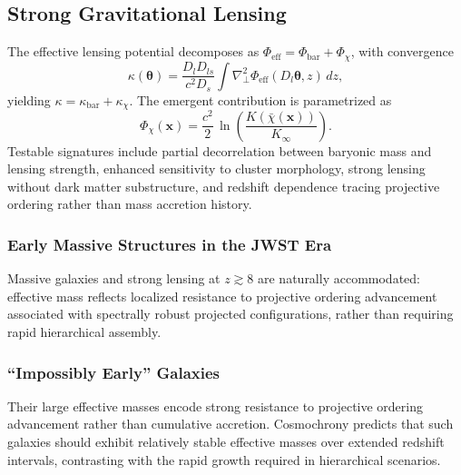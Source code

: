 \subsection{Strong Gravitational Lensing}
  \label{subsec:strong-gravitational-lensing}

  The effective lensing potential decomposes as
  $\Phi_{\mathrm{eff}} = \Phi_{\mathrm{bar}} + \Phi_{\chi}$,
  with convergence
  \begin{equation}
    \kappa(\boldsymbol{\theta})
    = \frac{D_l D_{ls}}{c^2 D_s}
    \int \nabla_\perp^2
    \Phi_{\mathrm{eff}}\!
    \left(D_l\boldsymbol{\theta},z\right)\,dz ,
  \end{equation}
  yielding $\kappa = \kappa_{\mathrm{bar}} + \kappa_{\chi}$.
  The emergent contribution is parametrized as
  \begin{equation}
    \Phi_{\chi}(\mathbf{x})
    = \frac{c^2}{2}\,
    \ln\!\left(
           \frac{K(\bar\chi(\mathbf{x}))}{K_\infty}
    \right).
  \end{equation}
  Testable signatures include partial decorrelation between baryonic mass
  and lensing strength, enhanced sensitivity to cluster morphology, strong
  lensing without dark matter substructure, and redshift dependence tracing
  projective ordering rather than mass accretion history.

  \subsubsection*{Early Massive Structures in the JWST Era}
    \label{subsec:jwst-early-structures}

    Massive galaxies and strong lensing at $z \gtrsim 8$ are naturally
    accommodated: effective mass reflects localized resistance to projective
    ordering advancement associated with spectrally robust projected configurations,
    rather than requiring rapid hierarchical assembly.

  \subsubsection*{``Impossibly Early'' Galaxies}
    \label{subsec:impossibly-early-galaxies}

    Their large effective masses encode strong resistance to projective ordering
    advancement rather than cumulative accretion.
    Cosmochrony predicts that such galaxies should exhibit relatively stable
    effective masses over extended redshift intervals, contrasting with the
    rapid growth required in hierarchical scenarios.

